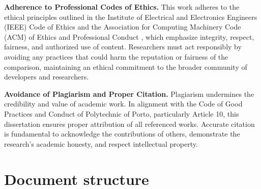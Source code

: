 \textbf{Adherence to Professional Codes of Ethics.} This work adheres to the ethical principles outlined in the Institute of Electrical and Electronics Engineers (IEEE) Code of Ethics \cite{ieee-ethics} and the Association for Computing Machinery Code (ACM) of Ethics and Professional Conduct \cite{acm-ethics}, which emphasize integrity, respect, fairness, and authorized use of content. Researchers must act responsibly by avoiding any practices that could harm the reputation or fairness of the comparison, maintaining an ethical commitment to the broader community of developers and researchers.

\textbf{Avoidance of Plagiarism and Proper Citation.} Plagiarism undermines the credibility and value of academic work. In alignment with the Code of Good Practices and Conduct of Polytechnic of Porto, particularly Article 10, this dissertation ensures proper attribution of all referenced works. Accurate citation is fundamental to acknowledge the contributions of others, demonstrate the research’s academic honesty, and respect intellectual property.

\section{Document structure} 